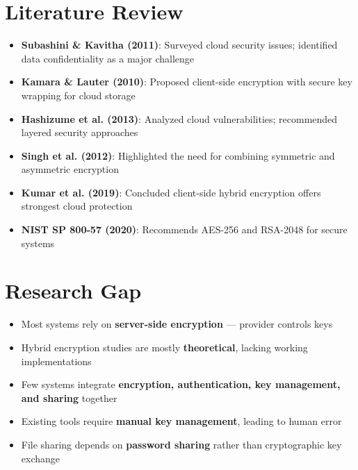 \documentclass{SKP-beamer}
\begin{document}
\section{Literature Review}
\begin{frame}{}
\begin{itemize}
  \item \textbf{Subashini \& Kavitha (2011)}: Surveyed cloud security issues; identified data confidentiality as a major challenge
  \item \textbf{Kamara \& Lauter (2010)}: Proposed client-side encryption with secure key wrapping for cloud storage
  \item \textbf{Hashizume et al. (2013)}: Analyzed cloud vulnerabilities; recommended layered security approaches
  \item \textbf{Singh et al. (2012)}: Highlighted the need for combining symmetric and asymmetric encryption
  \item \textbf{Kumar et al. (2019)}: Concluded client-side hybrid encryption offers strongest cloud protection
  \item \textbf{NIST SP 800-57 (2020)}: Recommends AES-256 and RSA-2048 for secure systems
\end{itemize}
\end{frame}

\section{Research Gap}
\begin{frame}{}
\begin{itemize}
  \item Most systems rely on \textbf{server-side encryption} --- provider controls keys
  \item Hybrid encryption studies are mostly \textbf{theoretical}, lacking working implementations
  \item Few systems integrate \textbf{encryption, authentication, key management, and sharing} together
  \item Existing tools require \textbf{manual key management}, leading to human error
  \item File sharing depends on \textbf{password sharing} rather than cryptographic key exchange
\end{itemize}
\end{frame}
\end{document}
